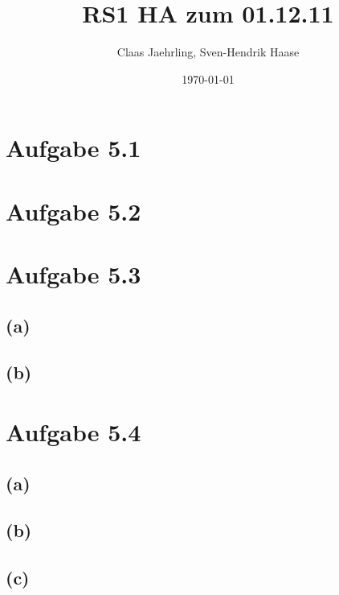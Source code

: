 \documentclass[12pt]{article}
\author{Claas Jaehrling, Sven-Hendrik Haase}
\title{RS1 HA zum 01.12.11}
\date{\today}
\begin{document}
\setcounter{secnumdepth}{0}
\maketitle

\section{Aufgabe 5.1}


\section{Aufgabe 5.2}

\section{Aufgabe 5.3}
\subsection{(a)}
\subsection{(b)}

\section{Aufgabe 5.4}
\subsection{(a)}
\subsection{(b)}
\subsection{(c)}

\begin{align}
\end{align}
\end{document}
